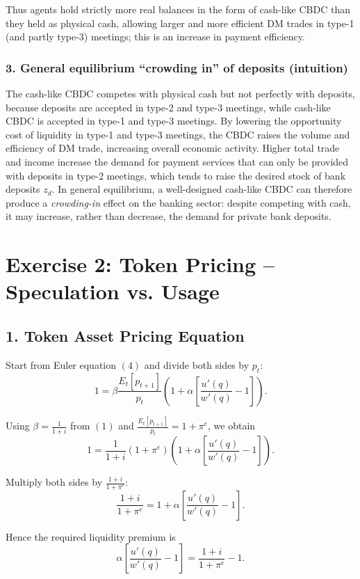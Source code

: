 \documentclass[11pt, a4paper]{article}
\begin{document}
Thus agents hold strictly more real balances in the form of cash-like CBDC than they held as physical cash, allowing larger and more efficient DM trades in type-1 (and partly type-3) meetings; this is an increase in payment efficiency.

\subsubsection*{3. General equilibrium “crowding in” of deposits (intuition)}

The cash-like CBDC competes with physical cash but not perfectly with deposits, because deposits are accepted in type-2 and type-3 meetings, while cash-like CBDC is accepted in type-1 and type-3 meetings.  
By lowering the opportunity cost of liquidity in type-1 and type-3 meetings, the CBDC raises the volume and efficiency of DM trade, increasing overall economic activity.  
Higher total trade and income increase the demand for payment services that can only be provided with deposits in type-2 meetings, which tends to raise the desired stock of bank deposits $z_d$.  
In general equilibrium, a well-designed cash-like CBDC can therefore produce a \emph{crowding-in} effect on the banking sector: despite competing with cash, it may increase, rather than decrease, the demand for private bank deposits.


\section*{Exercise 2: Token Pricing -- Speculation vs. Usage}

\subsection*{1. Token Asset Pricing Equation}

Start from Euler equation \((4)\) and divide both sides by \(p_t\):
\[
1
= \beta \frac{E_t[p_{t+1}]}{p_t}
\left(
1 + \alpha\left[\frac{u'(q)}{w'(q)} - 1\right]
\right).
\]

Using \(\beta = \frac{1}{1+i}\) from \((1)\) and \(\frac{E_t[p_{t+1}]}{p_t} = 1 + \pi^e\), we obtain
\[
1
= \frac{1}{1+i} (1+\pi^e)
\left(
1 + \alpha\left[\frac{u'(q)}{w'(q)} - 1\right]
\right).
\]

Multiply both sides by \(\frac{1+i}{1+\pi^e}\):
\[
\frac{1+i}{1+\pi^e}
=
1 + \alpha\left[\frac{u'(q)}{w'(q)} - 1\right].
\]

Hence the required liquidity premium is
\[
\alpha\left[\frac{u'(q)}{w'(q)} - 1\right]
= \frac{1+i}{1+\pi^e} - 1.
\]
\end{document}
